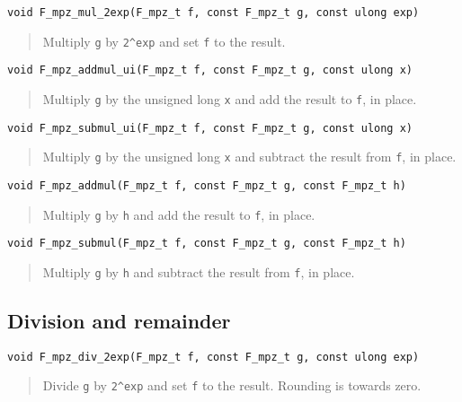 \documentclass[a4paper,10pt]{article}
\newcommand{\code}{\lstinline}
\begin{document}
\begin{lstlisting}
void F_mpz_mul_2exp(F_mpz_t f, const F_mpz_t g, const ulong exp)
\end{lstlisting}
\begin{quote}
Multiply \code{g} by \code{2^exp} and set \code{f} to the result.
\end{quote}

\begin{lstlisting}
void F_mpz_addmul_ui(F_mpz_t f, const F_mpz_t g, const ulong x)
\end{lstlisting}
\begin{quote}
Multiply \code{g} by the unsigned long \code{x} and add the result to \code{f}, in place.
\end{quote}

\begin{lstlisting}
void F_mpz_submul_ui(F_mpz_t f, const F_mpz_t g, const ulong x)
\end{lstlisting}
\begin{quote}
Multiply \code{g} by the unsigned long \code{x} and subtract the result from \code{f}, in place.
\end{quote}

\begin{lstlisting}
void F_mpz_addmul(F_mpz_t f, const F_mpz_t g, const F_mpz_t h)
\end{lstlisting}
\begin{quote}
Multiply \code{g} by \code{h} and add the result to \code{f}, in place.
\end{quote}

\begin{lstlisting}
void F_mpz_submul(F_mpz_t f, const F_mpz_t g, const F_mpz_t h)
\end{lstlisting}
\begin{quote}
Multiply \code{g} by \code{h} and subtract the result from \code{f}, in place.
\end{quote}

\subsection{Division and remainder}

\begin{lstlisting}
void F_mpz_div_2exp(F_mpz_t f, const F_mpz_t g, const ulong exp)
\end{lstlisting}
\begin{quote}
Divide \code{g} by \code{2^exp} and set \code{f} to the result. Rounding is towards zero.
\end{quote}
\end{document}
